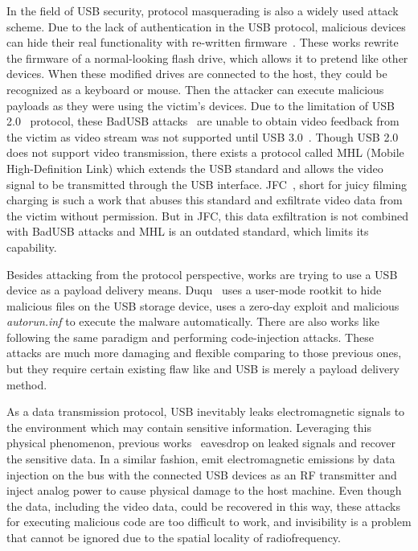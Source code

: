 In the field of USB security, protocol masquerading is also a widely used
attack scheme. Due to the lack of authentication in the USB protocol, malicious
devices can hide their real functionality with re-written
firmware~\cite{rubber,badusb,rubberducky2020,usbbypassing,iseeyou,usbdriver}.
These works rewrite the firmware of a normal-looking flash drive, which allows
it to pretend like other devices. When these modified drives are connected to the
host, they could be recognized as a keyboard or mouse. Then the attacker can
execute malicious payloads as they were using the victim's devices. Due to the
limitation of USB 2.0~\cite{usb20} protocol, these BadUSB
attacks~\cite{badusb} are unable to obtain video feedback from the victim
as video stream was not supported until USB 3.0~\cite{usb30}. Though USB 2.0 does not
support video transmission, there exists a protocol called MHL (Mobile
High-Definition Link) which extends the USB standard and allows the video signal to
be transmitted through the USB interface. JFC~\cite{JFC}, short for juicy filming
charging is such a work that abuses this standard and exfiltrate video data
from the victim without permission. But in JFC, this data exfiltration is not
combined with BadUSB attacks and MHL is an outdated standard, which limits its
capability.

Besides attacking from the protocol perspective, works are trying to use a
USB device as a payload delivery means. Duqu~\cite{duqu} uses a user-mode
rootkit to hide malicious files on the USB storage device, \cite{flame} uses a
zero-day exploit and malicious \textit{autorun.inf} to execute the malware
automatically. There are also works like \cite{brain,stuxnet,conficker}
following the same paradigm and performing code-injection attacks. These
attacks are much more damaging and flexible comparing to those previous ones,
but they require certain existing flaw like \cite{zero-day} and USB is merely
a payload delivery method.

As a data transmission protocol, USB inevitably leaks electromagnetic signals
to the environment which may contain sensitive information. Leveraging this
physical phenomenon, previous works~\cite{smartphone,
poweremi,revealing,su2017usb,usbgpslocator,bates2014leveraging,badusbhub,usbfinger,side,usbdriver}
eavesdrop on leaked signals and recover the sensitive data. In a similar fashion,
\cite{usbee,turnip} emit electromagnetic emissions by data injection on the bus
with the connected USB devices as an RF transmitter and \cite{usbkiller,cable}
inject analog
power to cause physical damage to the host machine. Even though the data,
including the video data, could be recovered in this way, these attacks for
executing malicious code are too difficult to work, and invisibility is a
problem that cannot be ignored due to the spatial locality of radiofrequency.


